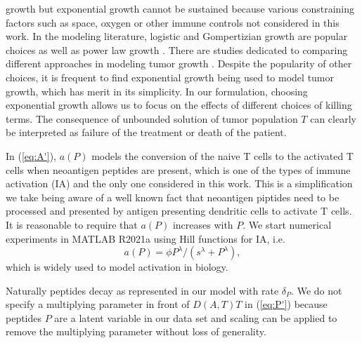 \documentclass[review,authoryear]{elsarticle}
\begin{document}
growth but exponential growth cannot be sustained because various
constraining factors such as space, oxygen or other immune controls not considered in this work.
In the modeling literature, logistic  \citep[e.g.][]{DePillis2013,Nikolopoulou2018}
and Gompertizian growth \citep[e.g.][]{Norton1988,Castillo2015} 
are popular choices as well as power law growth \citep{Dethlefsen1968}.
There are studies dedicated to comparing different approaches in modeling
tumor growth \citep{Murphy2016}. Despite the popularity of other
choices, it is frequent to find exponential growth being used to model
tumor growth, which has merit in its simplicity. In our formulation,
choosing exponential growth allows us to focus on the effects of different
choices of killing terms. The consequence of unbounded solution of
tumor population $T$ can clearly be interpreted as failure of the
treatment or death of the patient. 

In (\ref{eq:A'}), $a(P)$ models the conversion of the naive T cells
to the activated T cells when neoantigen peptides are present, which is
one of the types of immune activation (IA) and the only one considered
in this work. This is a simplification we take being aware of a well
known fact that neoantigen piptides need to be processed and presented
by antigen presenting dendritic cells to activate T cells. It is reasonable
to require that $a(P)$ increases with $P$. We start numerical experiments
in MATLAB R2021a using Hill functions for IA, i.e. 
\begin{equation} \label{eq:hill-a(P)}
a(P)=\phi P^{\lambda}/(s^{\lambda}+P^{\lambda}), 
\end{equation}
which is widely used to model activation in biology.

Naturally peptides decay as represented in our model with rate $\delta_{P}$.
We do not specify a multiplying parameter in front of $D(A,T)T$ in
(\ref{eq:P'}) because peptides $P$ are a latent variable in our data set and scaling
can be applied to remove the multiplying parameter without loss of
generality.
\end{document}

